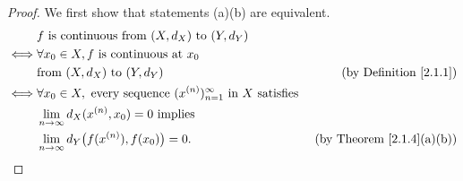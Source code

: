 \begin{proof}
    We first show that statements (a)(b) are equivalent.
    \begin{align*}
             & f \text{ is continuous from } (X, d_X) \text{ to } (Y, d_Y)                                                                                  \\
        \iff & \forall x_0 \in X, f \text{ is continuous at } x_0                                                                                           \\
             & \text{from } (X, d_X) \text{ to } (Y, d_Y)                                                           & \text{(by Definition \ref{2.1.1})}    \\
        \iff & \forall x_0 \in X, \text{ every sequence } (x^{(n)})_{n = 1}^\infty \text{ in } X \text{ satisfies }                                         \\
             & \lim_{n \to \infty} d_X(x^{(n)}, x_0) = 0 \text{ implies}                                                                                    \\
             & \lim_{n \to \infty} d_Y\big(f(x^{(n)}), f(x_0)\big) = 0.                                             & \text{(by Theorem \ref{2.1.4}(a)(b))}
    \end{align*}


\end{proof}
